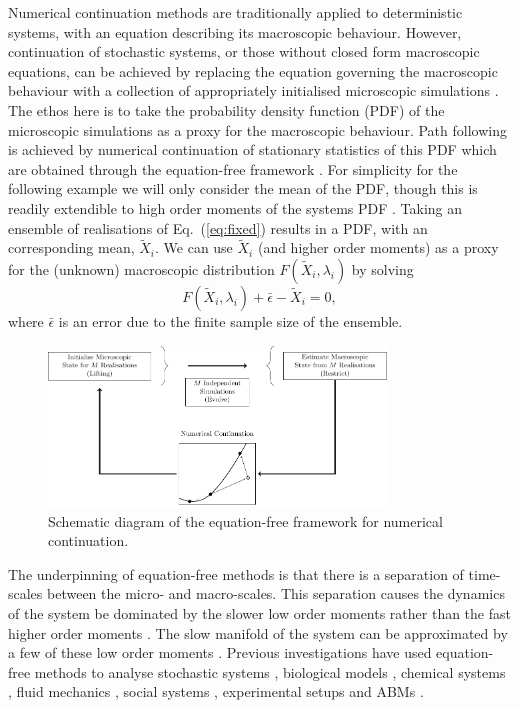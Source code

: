 \documentclass[11pt]{article}
\begin{document}
Numerical continuation methods are traditionally applied to deterministic systems, with an equation describing its macroscopic behaviour. However, continuation of stochastic systems, or those without closed form macroscopic equations, can be achieved by replacing the equation governing the macroscopic behaviour with a collection of appropriately initialised microscopic simulations \cite{Kevrekidis2009}. The ethos here is to take the probability density function (PDF) of the microscopic simulations as a proxy for the macroscopic behaviour. Path following is achieved by numerical continuation of stationary statistics of this PDF which are obtained through the equation-free framework \cite{Barkley2006,Thomas2016ember}. For simplicity for the following example we will only consider the mean of the PDF, though this is readily extendible to high order moments of the systems PDF \cite{Barkley2006}. Taking an ensemble of realisations of Eq.~(\ref{eq:fixed}) results in a PDF, with an corresponding mean, $\tilde X_i$. We can use $\tilde X_i$ (and higher order moments) as a proxy for the (unknown) macroscopic distribution $F(\tilde X_i,\lambda_i)$ by solving 
\begin{equation}
F(\tilde X_i,\lambda_i)+\bar{\epsilon}-\tilde X_i = 0,
\label{eq:ABM_PDF_samplingerror}
\end{equation}
where $\bar{\epsilon}$ is an error due to the finite sample size of the ensemble. 

\begin{figure}
\centering
\includegraphics[width=0.8\textwidth]{EquationFree}
\caption{Schematic diagram of the equation-free framework for numerical continuation. \label{fig:ef}}
\end{figure}

The underpinning of equation-free methods is that there is a separation of time-scales between the micro- and macro-scales. This separation causes the dynamics of the system be dominated by the slower low order moments rather than the fast higher order moments \cite{Kevrekidis2003}. The slow manifold of the system can be approximated by a few of these low order moments \cite{Kevrekidis2009}.
Previous investigations have used equation-free methods to analyse stochastic systems \cite{Barkley2006}, biological models \cite{Erban2007}, chemical systems \cite{Kevrekidis2003}, fluid mechanics \cite{Li2007}, social systems \cite{Thomas2016limno}, experimental setups \cite{Sieber2008} and ABMs \cite{Avitabile2014, Thomas2016ember}.
\end{document}
